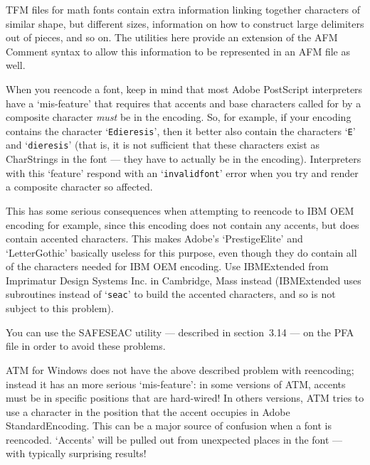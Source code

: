TFM files for math fonts contain extra information linking together
characters of similar shape, but different sizes, information on how to
construct large delimiters out of pieces, and so on.  The utilities here
provide an extension of the AFM Comment syntax to allow this information to
be represented in an AFM file as well.



When you reencode a font, keep in mind that most Adobe Post\-Script
interpreters have a `mis-feature' that requires that accents and base
characters called for by a composite character {\it must} be in the encoding. 
So, for example, if your encoding contains the character `{\tt Edieresis}',
then it better also contain the characters `{\tt E}' and `{\tt dieresis}' 
(that is, it is not sufficient that
these characters exist as Char\-Strings in the font --- 
they have to actually be in the  encoding).  
Interpreters with this `feature' respond with an `{\tt invalidfont}'
error when you try and render a composite character so affected.

This has some serious consequences when attempting to reencode to IBM OEM
encoding for example, since this encoding does not contain any accents, but
does contain accented characters.  This makes Adobe's `PrestigeElite' and
`LetterGothic' basically useless for this purpose, even though they do contain
all of the characters needed for IBM OEM encoding.  
Use IBMExtended from Imprimatur Design Systems Inc. in Cambridge, Mass instead
(IBMExtended uses subroutines instead of %
`{\tt seac}' 
to build the accented characters, and so is not subject to this problem).

You can use the SAFESEAC utility --- described in section~3.14 --- 
on the PFA file in order to avoid these problems.



ATM for Windows does not have the above described problem with reencoding; 
instead it has an more serious `mis-feature': 
in some versions of ATM, accents must be in specific positions that are 
hard-wired!
In others versions, ATM tries to use a character in the position that
the accent occupies in Adobe StandardEncoding.
This can be a major source of confusion when a font is reencoded.
`Accents' will be pulled out from unexpected places in the font
--- with typically surprising results!

